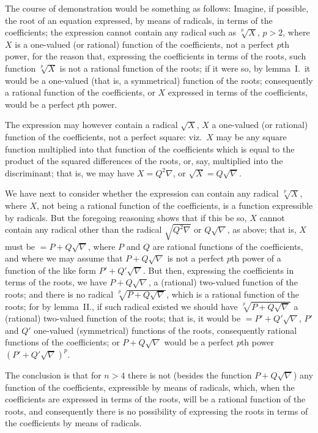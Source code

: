 \documentclass[11pt,a4paper]{article}
\theoremstyle{plain}
\theoremstyle{definition}
\begin{document}
The course of demonstration would be something as follows: Imagine, if possible,
the root of an equation expressed, by means of radicals, in terms of the coefficients;
the expression cannot contain any radical such as $\sqrt[p]{X}$, $p>2$, where $X$ is a one-valued
(or rational) function of the coefficients, not a perfect $p$th power, for the reason that,
expressing the coefficients in terms of the roots, such function $\sqrt[p]{X}$ is not a rational
function of the roots; if it were so, by lemma~I.\ it would be a one-valued (that is,
a symmetrical) function of the roots; consequently a rational function of the coefficients,
or $X$ expressed in terms of the coefficients, would be a perfect $p$th power.

The expression may however contain a radical $\sqrt{X}$, $X$ a one-valued (or rational)
function of the coefficients, not a perfect square: viz.\ $X$ may be any square function
multiplied into that function of the coefficients which is equal to the product of the
squared differences of the roots, or, say, multiplied into the discriminant; that is, we
may have $X = Q^2\nabla$, or $\sqrt{X} = Q\sqrt{\nabla}$.

We have next to consider whether the expression can contain any radical
$\sqrt[p]{X}$, where $X$, not being a rational function of the coefficients, is a function expressible by
radicals.  But the foregoing reasoning shows that if this be so, $X$ cannot contain any
radical other than the radical $\sqrt{Q^2\nabla}$ or $Q\sqrt{\nabla}$, as above; that is, $X$ must be
$= P + Q\sqrt{\nabla}$, where $P$ and $Q$ are rational functions of the coefficients, and where we
may assume that $P + Q\sqrt{\nabla}$ is not a perfect $p$th power of a function of the like form
$P' + Q'\sqrt{\nabla}$.  But then, expressing the coefficients in terms of the roots, we have
$P + Q\sqrt{\nabla}$, a (rational) two-valued function of the roots; and there is no radical
$\sqrt[p]{P + Q\sqrt{\nabla}}$, which is a rational function of the roots; for by lemma~II., if such
radical existed we should have $\sqrt[p]{P + Q\sqrt{\nabla}}$ a (rational) two-valued function of the
roots; that is, it would be $= P' + Q'\sqrt{\nabla}$, $P'$ and $Q'$ one-valued (symmetrical) functions
of the roots, consequently rational functions of the coefficients; or $P + Q\sqrt{\nabla}$ would
be a perfect $p$th power $(P' + Q'\sqrt{\nabla})^p$.

The conclusion is that for $n>4$ there is not (besides the function $P + Q\sqrt{\nabla}$)
any function of the coefficients, expressible by means of radicals, which, when the
coefficients are expressed in terms of the roots, will be a rational function of the
roots, and consequently there is no possibility of expressing the roots in terms of the
coefficients by means of radicals.
\end{document}
